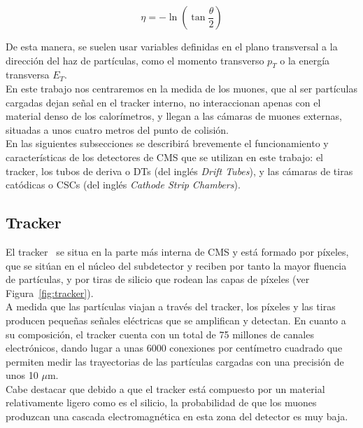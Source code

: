 \begin{equation}
  \eta = -\ln\left(\tan\dfrac{\theta}{2}\right)
\label{eq:eta}
\end{equation}


De esta manera, se suelen usar variables definidas en el plano transversal a la dirección del haz de partículas, como el momento transverso $p_{T}$ o la energía transversa $E_{T}$. \\

En este trabajo nos centraremos en la medida de los muones, que al ser part\'iculas cargadas dejan se\~nal en el tracker interno, no interaccionan apenas con el material denso de los calor\'imetros, y llegan a las c\'amaras de muones externas, situadas a unos cuatro metros del punto de colisi\'on. \\

En las siguientes subsecciones se describir\'a brevemente el funcionamiento y caracter\'isticas de los detectores de CMS que se utilizan en este trabajo: el tracker, los tubos de deriva o DTs (del ingl\'es \textit{Drift Tubes}), y las c\'amaras de tiras cat\'odicas o CSCs (del ingl\'es \textit{Cathode Strip Chambers}).

\subsection{Tracker}\label{sec:tracker}

El tracker~\cite{trackerperformance} se situa en la parte m\'as interna de CMS y est\'a formado por p\'ixeles, que se sit\'uan en el n\'ucleo del subdetector y reciben por tanto la mayor fluencia de part\'iculas, y por tiras de silicio que rodean las capas de p\'ixeles (ver Figura~\ref{fig:tracker}). \\ 

A medida que las part\'iculas viajan a trav\'es del tracker, los p\'ixeles y las tiras producen peque\~nas se\~nales el\'ectricas que se amplifican y detectan. En cuanto a su composici\'on, el tracker cuenta con un total de 75 millones de canales electr\'onicos, dando lugar a unas 6000 conexiones por cent\'imetro cuadrado que permiten medir las trayectorias de las part\'iculas cargadas con una precisi\'on de unos 10 $\mu$m. \\
Cabe destacar que debido a que el tracker est\'a compuesto por un material relativamente ligero como es el silicio, la probabilidad de que los muones produzcan una cascada electromagn\'etica en esta zona del detector es muy baja.  \\

